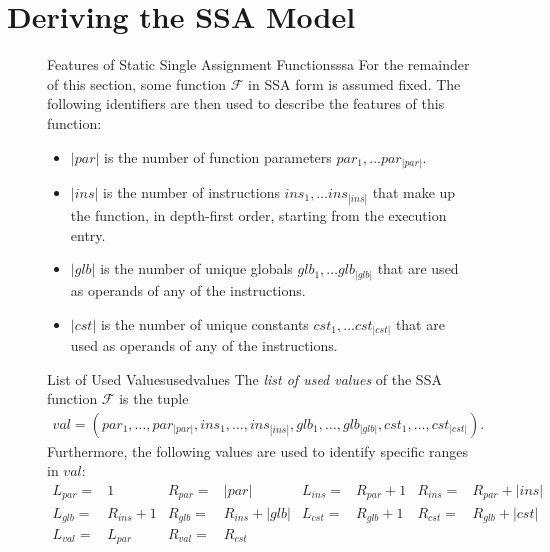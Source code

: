 \section{Deriving the SSA Model}

\begin{figure}[p]
\begin{definition}{Features of Static Single Assignment Functions}{ssa}
    For the remainder of this section, some function $\mathcal F$ in SSA form is
    assumed fixed. 
    The following identifiers are then used to describe the features of this
    function:

    \begin{itemize}[topsep=0pt,itemsep=0pt,partopsep=0pt,parsep=0pt]
    \item $|par|$ is the number of function parameters
          $par_1,\dots par_{|par|}$.
    \item $|ins|$ is the number of instructions $ins_1,\dots ins_{|ins|}$ that
          make up the function, in depth-first order, starting from the
          execution entry.
    \item $|glb|$ is the number of unique globals $glb_1,\dots glb_{|glb|}$ that
          are used as operands of any of the instructions.
    \item $|cst|$ is the number of unique constants $cst_1,\dots cst_{|cst|}$
          that are used as operands of any of the instructions.
    \end{itemize}
\end{definition}
\begin{definition}{List of Used Values}{usedvalues}
    The {\em list of used values} of the SSA function $\mathcal F$ is the tuple
    \begin{align*}
       val = (par_1,\dots,par_{|par|},
              ins_1,\dots,ins_{|ins|},
              glb_1,\dots,glb_{|glb|},
              cst_1,\dots,cst_{|cst|}).
    \end{align*}
    Furthermore, the following values are used to identify specific ranges in
    $val$:
    \begin{align*}
        L_{par}={}&1         & R_{par}={}&|par| &
        L_{ins}={}&R_{par}+1 & R_{ins}={}&R_{par}+|ins|\\[-1.5mm]
        L_{glb}={}&R_{ins}+1 & R_{glb}={}&R_{ins}+|glb| &
        L_{cst}={}&R_{glb}+1 & R_{cst}={}&R_{glb}+|cst|\\[-1.5mm]
        L_{val}={}&L_{par}   & R_{val}={}&R_{cst} &&&&
    \end{align*}
\end{definition}

\end{figure}
